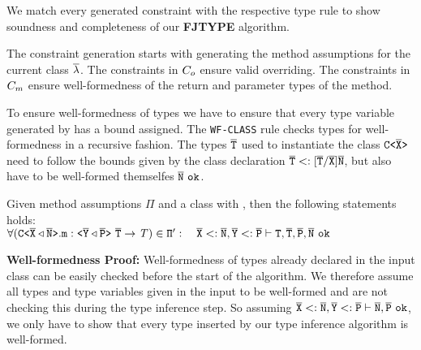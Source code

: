 
We match every generated constraint with the respective type rule to show soundness and completeness of our \textbf{FJTYPE} algorithm.

The constraint generation starts with generating the method assumptions for the current class $\overline{\mathtt{\lambda}}$.
The constraints in $C_o$ ensure valid overriding.
The constraints in $C_m$ ensure well-formedness of the return and parameter types of the method.

To ensure well-formedness of types we have to ensure that every type variable generated by \fjtype{} has a bound assigned.
The \texttt{WF-CLASS} rule checks types for well-formedness in a recursive fashion.
The types $\overline{\tt T}$ used to instantiate the class $\mathtt{C \texttt{<} \overline{\tt X} \texttt{>} }$ need to follow the bounds given by the class declaration $\overline{\tt T} <: [\overline{\tt T}/\overline{\tt X}]\overline{\tt N}$, but also have to be well-formed themselfes $\overline{\tt N}\ \texttt{ok}$.
\begin{lemma}\label{lemma:well-formedness}
  Given method assumptions $\Pi$ and a class  with
  ,
  then the following statements holds:\\
  \normalfont $\forall (\exptype{C}{\ol{X} \triangleleft \ol{N}}.\texttt{m} : \exptype{}{\ol{Y} \triangleleft \ol{P}}\ \ol{\type{T}} \to \itype{T}) \in \mv{\Pi}': \quad \ol{X} <: \ol{N}, \ol{Y} <: \ol{P} \vdash \type{T}, \ol{T}, \ol{P}, \ol{N}\ \texttt{ok}$
\end{lemma}
\textbf{Well-formedness Proof:}
Well-formedness of types already declared in the input class can be easily checked before the start of the \fjtype{} algorithm.
We therefore assume all types and type variables given in the input to be well-formed and are not checking this during the type inference step.
So assuming $\ol{X} <: \ol{N}, \ol{Y} <: \ol{P} \vdash \ol{N}, \ol{P}\ \texttt{ok}$, we only have to show that every type inserted by our type inference algorithm is well-formed.

